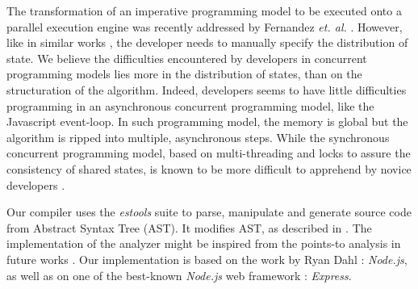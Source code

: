 
The transformation of an imperative programming model to be executed onto a parallel execution engine was recently addressed by Fernandez \textit{et. al.} \cite{Fernandez2014a}.
However, like in similar works \cite{Mitchell2012,Power2010}, the developer needs to manually specify the distribution of state.
We believe the difficulties encountered by developers in concurrent programming models lies more in the distribution of states, than on the structuration of the algorithm.
Indeed, developers seems to have little difficulties programming in an asynchronous concurrent programming model, like the Javascript event-loop.
In such programming model, the memory is global but the algorithm is ripped into multiple, asynchronous steps.
While the synchronous concurrent programming model, based on multi-threading and locks to assure the consistency of shared states, is known to be more difficult to apprehend by novice developers \cite{Adya2002}.




Our compiler uses the \textit{estools} suite to parse, manipulate and generate source code from Abstract Syntax Tree (AST).
It modifies AST, as described in \cite{Jones2003}.
The implementation of the analyzer might be inspired from the points-to analysis in future works \cite{Wei2014}.
Our implementation is based on the work by Ryan Dahl : \textit{Node.js}, as well as on one of the best-known \textit{Node.js} web framework : \textit{Express}.